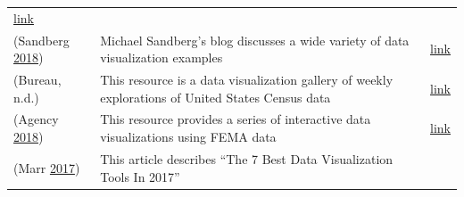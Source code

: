 \documentclass[]{book}
\theoremstyle{definition}
\theoremstyle{definition}
\theoremstyle{definition}
\theoremstyle{remark}
\begin{document}
\begin{longtable}[]{@{}lll@{}}
\begin{minipage}[t]{0.48\columnwidth}
\href{http://beautifuldata.net}{link}\strut
\end{minipage}\tabularnewline
\begin{minipage}[t]{0.15\columnwidth}\raggedright\strut
(Sandberg \protect\hyperlink{ref-sandberg_blog}{2018})\strut
\end{minipage} & \begin{minipage}[t]{0.28\columnwidth}\raggedright\strut
Michael Sandberg's blog discusses a wide variety of data visualization
examples\strut
\end{minipage} & \begin{minipage}[t]{0.48\columnwidth}\raggedright\strut
\href{https://datavizblog.com}{link}\strut
\end{minipage}\tabularnewline
\begin{minipage}[t]{0.15\columnwidth}\raggedright\strut
(Bureau, n.d.)\strut
\end{minipage} & \begin{minipage}[t]{0.28\columnwidth}\raggedright\strut
This resource is a data visualization gallery of weekly explorations of
United States Census data\strut
\end{minipage} & \begin{minipage}[t]{0.48\columnwidth}\raggedright\strut
\href{https://www.census.gov/dataviz/}{link}\strut
\end{minipage}\tabularnewline
\begin{minipage}[t]{0.15\columnwidth}\raggedright\strut
(Agency \protect\hyperlink{ref-fema_viz}{2018})\strut
\end{minipage} & \begin{minipage}[t]{0.28\columnwidth}\raggedright\strut
This resource provides a series of interactive data visualizations using
FEMA data\strut
\end{minipage} & \begin{minipage}[t]{0.48\columnwidth}\raggedright\strut
\href{https://www.fema.gov/data-visualization}{link}\strut
\end{minipage}\tabularnewline
\begin{minipage}[t]{0.15\columnwidth}\raggedright\strut
(Marr \protect\hyperlink{ref-7_best_tools}{2017})\strut
\end{minipage} & \begin{minipage}[t]{0.28\columnwidth}\raggedright\strut
This article describes ``The 7 Best Data Visualization Tools In
2017''\strut
\end{minipage} & \begin{minipage}[t]{0.48\columnwidth}\raggedright\strut

\end{minipage}
\end{longtable}
\end{document}
